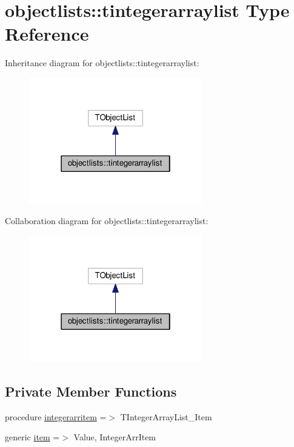 \hypertarget{structobjectlists_1_1tintegerarraylist}{}\section{objectlists\+:\+:tintegerarraylist Type Reference}
\label{structobjectlists_1_1tintegerarraylist}


Inheritance diagram for objectlists\+:\+:tintegerarraylist\+:
\nopagebreak
\begin{figure}[H]
\begin{center}
\leavevmode
\includegraphics[width=214pt]{structobjectlists_1_1tintegerarraylist__inherit__graph}
\end{center}
\end{figure}


Collaboration diagram for objectlists\+:\+:tintegerarraylist\+:
\nopagebreak
\begin{figure}[H]
\begin{center}
\leavevmode
\includegraphics[width=214pt]{structobjectlists_1_1tintegerarraylist__coll__graph}
\end{center}
\end{figure}
\subsection*{Private Member Functions}
\begin{DoxyCompactItemize}
\item 
procedure \mbox{\hyperlink{structobjectlists_1_1tintegerarraylist_aa20cd53ae8df2065aa764861d0d3060a}{integerarritem}} =$>$ T\+Integer\+Array\+List\+\_\+\+Item
\item 
generic \mbox{\hyperlink{structobjectlists_1_1tintegerarraylist_a717d0468f7abb94ff960917c5e5d9a2d}{item}} =$>$ Value, Integer\+Arr\+Item
\end{DoxyCompactItemize}



